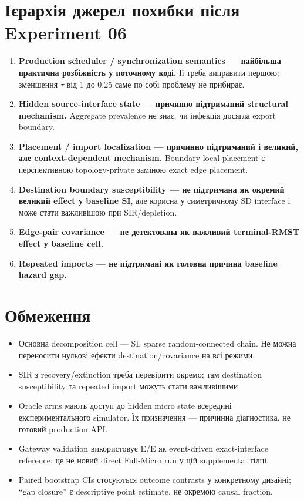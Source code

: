 \documentclass[11pt,a4paper]{article}
\begin{document}
\section{Ієрархія джерел похибки після Experiment 06}
\begin{enumerate}
\item \textbf{Production scheduler / synchronization semantics --- найбільша практична розбіжність у поточному коді.} Її треба виправити першою; зменшення $\tau$ від 1 до 0.25 саме по собі проблему не прибирає.
\item \textbf{Hidden source-interface state --- причинно підтриманий structural mechanism.} Aggregate prevalence не знає, чи інфекція досягла export boundary.
\item \textbf{Placement / import localization --- причинно підтриманий і великий, але context-dependent mechanism.} Boundary-local placement є перспективною topology-private заміною exact edge placement.
\item \textbf{Destination boundary susceptibility --- не підтримана як окремий великий effect у baseline SI}, але корисна у симетричному SD interface і може стати важливішою при SIR/depletion.
\item \textbf{Edge-pair covariance --- не детектована як важливий terminal-RMST effect у baseline cell.}
\item \textbf{Repeated imports --- не підтримані як головна причина baseline hazard gap.}
\end{enumerate}

\section{Обмеження}
\begin{itemize}
\item Основна decomposition cell --- SI, sparse random-connected chain. Не можна переносити нульові ефекти destination/covariance на всі режими.
\item SIR з recovery/extinction треба перевірити окремо; там destination susceptibility та repeated import можуть стати важливішими.
\item Oracle arms мають доступ до hidden micro state всередині експериментального simulator. Їх призначення --- причинна діагностика, не готовий production API.
\item Gateway validation використовує E/E як event-driven exact-interface reference; це не новий direct Full-Micro run у цій supplemental гілці.
\item Paired bootstrap CIs стосуються outcome contrasts у конкретному дизайні; ``gap closure'' є descriptive point estimate, не окремою causal fraction.
\end{itemize}
\end{document}
